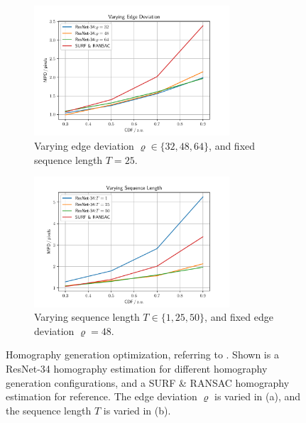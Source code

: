\begin{figure}
\centering
\begin{subfigure}[b]{\textwidth}
    \centering
    \includegraphics[width=0.8\textwidth]{fig/frac/var_rho.pdf}
    \caption{Varying edge deviation $\varrho\in\{32,48,64\}$, and fixed sequence length $T=25$.}
    \label{c3:fig:resnet34_a}
\end{subfigure}
\begin{subfigure}[b]{\textwidth}
    \centering
    \includegraphics[width=0.8\textwidth]{fig/frac/var_seq.pdf}
    \caption{Varying sequence length $T\in\{1,25,50\}$, and fixed edge deviation $\varrho=48$.}
    \label{c3:fig:resnet34_b}
\end{subfigure}
\caption{Homography generation optimization, referring to . Shown is a ResNet-34 homography estimation for different homography generation configurations, and a SURF \& RANSAC homography estimation for reference. The edge deviation $\varrho$ is varied in (a), and the sequence length $T$ is varied in (b).}
\label{c3:fig:resnet34}
\end{figure}

